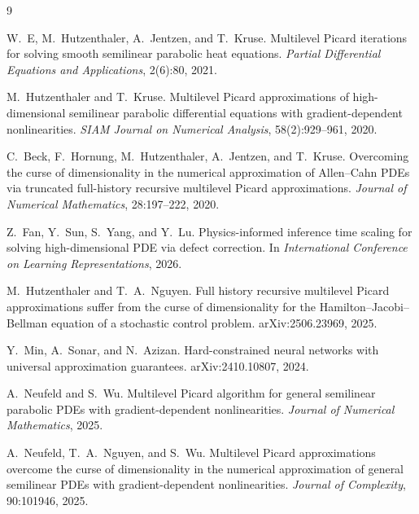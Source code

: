 \begin{thebibliography}{9}

W.~E, M.~Hutzenthaler, A.~Jentzen, and T.~Kruse.
\newblock Multilevel Picard iterations for solving smooth semilinear parabolic heat equations.
\newblock \emph{Partial Differential Equations and Applications}, 2(6):80, 2021.

M.~Hutzenthaler and T.~Kruse.
\newblock Multilevel Picard approximations of high-dimensional semilinear parabolic differential equations with gradient-dependent nonlinearities.
\newblock \emph{SIAM Journal on Numerical Analysis}, 58(2):929--961, 2020.

C.~Beck, F.~Hornung, M.~Hutzenthaler, A.~Jentzen, and T.~Kruse.
\newblock Overcoming the curse of dimensionality in the numerical approximation of Allen--Cahn PDEs via truncated full-history recursive multilevel Picard approximations.
\newblock \emph{Journal of Numerical Mathematics}, 28:197--222, 2020.

Z.~Fan, Y.~Sun, S.~Yang, and Y.~Lu.
\newblock Physics-informed inference time scaling for solving high-dimensional PDE via defect correction.
\newblock In \emph{International Conference on Learning Representations}, 2026.

M.~Hutzenthaler and T.~A.~Nguyen.
\newblock Full history recursive multilevel Picard approximations suffer from the curse of dimensionality for the Hamilton--Jacobi--Bellman equation of a stochastic control problem.
\newblock arXiv:2506.23969, 2025.

Y.~Min, A.~Sonar, and N.~Azizan.
\newblock Hard-constrained neural networks with universal approximation guarantees.
\newblock arXiv:2410.10807, 2024.

A.~Neufeld and S.~Wu.
\newblock Multilevel Picard algorithm for general semilinear parabolic PDEs with gradient-dependent nonlinearities.
\newblock \emph{Journal of Numerical Mathematics}, 2025.

A.~Neufeld, T.~A.~Nguyen, and S.~Wu.
\newblock Multilevel Picard approximations overcome the curse of dimensionality in the numerical approximation of general semilinear PDEs with gradient-dependent nonlinearities.
\newblock \emph{Journal of Complexity}, 90:101946, 2025.

\end{thebibliography}

